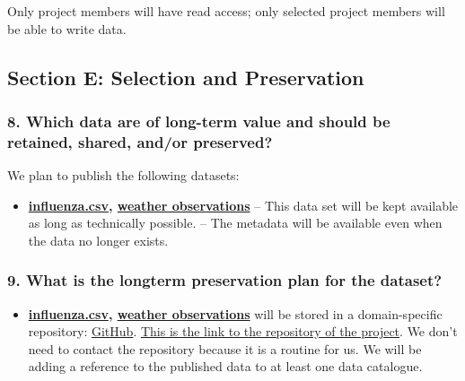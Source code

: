 \documentclass[
]{article}
\providecommand{\tightlist}{%
  \setlength{\itemsep}{0pt}\setlength{\parskip}{0pt}}
\begin{document}
Only project members will have read access; only selected project
members will be able to write data.

\hypertarget{sec-selection-preservation}{}
\hypertarget{section-e-selection-and-preservation}{%
\subsection{Section E: Selection and
Preservation}\label{section-e-selection-and-preservation}}

\hypertarget{q-which-longterm}{}
\hypertarget{which-data-are-of-long-term-value-and-should-be-retained-shared-andor-preserved}{%
\subsubsection{8. Which data are of long-term value and should be
retained, shared, and/or
preserved?}\label{which-data-are-of-long-term-value-and-should-be-retained-shared-andor-preserved}}

We plan to publish the following datasets:

\begin{itemize}
\tightlist
\item
  \textbf{\href{https://www.data.gv.at/katalog/dataset/grippemeldedienst-stadt-wien}{influenza.csv}, \href{https://www.meteoblue.com/en/weather/archive/export/vienna_austria_2761369}{weather observations}} {--} This data set will
  be kept available as long as technically possible. {--} The metadata
  will be available even when the data no longer exists.
\end{itemize}

\hypertarget{q-longterm-plan}{}
\hypertarget{what-is-the-longterm-preservation-plan-for-the-dataset}{%
\subsubsection{9. What is the longterm preservation plan for the
dataset?}\label{what-is-the-longterm-preservation-plan-for-the-dataset}}

\begin{itemize}
\tightlist
\item
  \textbf{\href{https://www.data.gv.at/katalog/dataset/grippemeldedienst-stadt-wien}{influenza.csv}, \href{https://www.meteoblue.com/en/weather/archive/export/vienna_austria_2761369}{weather observations}} will be stored in a
  domain-specific repository:
  \href{https://fairsharing.org/bsg-d001160}{GitHub}. \href{https://github.com/hudcondr/data-stewardship-ex1}{This is the link to the repository of the project}. We don't need to
  contact the repository because it is a routine for us. We will be
  adding a reference to the published data to at least one data
  catalogue.
\end{itemize}
\end{document}
